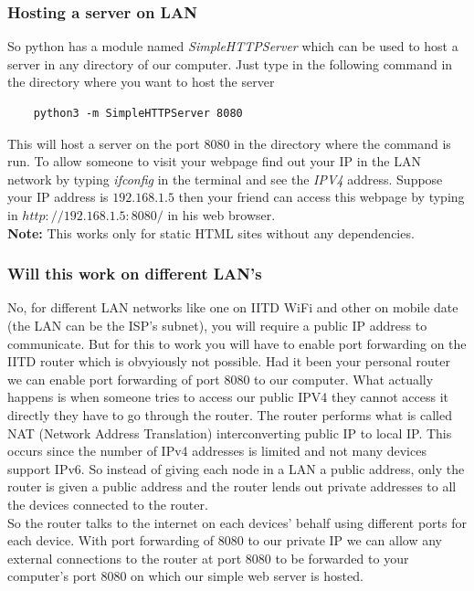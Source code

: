 \documentclass[12pt]{article}
\begin{document}
\subsubsection{Hosting a server on LAN}
So python has a module named \textit{SimpleHTTPServer} which can be used to host a server in any directory of our computer. Just type in the following command in the directory where you want to host the server

\begin{verbatim}
    python3 -m SimpleHTTPServer 8080
\end{verbatim}
This will host a server on the port 8080 in the directory where the command is run. To allow someone to visit your webpage find out your IP in the LAN network by typing \textit{ifconfig} in the terminal and see the \textit{IPV4} address.
Suppose your IP address is $192.168.1.5$ then your friend can access this webpage by typing in $http://192.168.1.5:8080/$ in his web browser.\\[0.2cm]

\textbf{Note:} This works only for static HTML sites without any dependencies.

\subsubsection{Will this work on different LAN's}
No, for different LAN networks like one on IITD WiFi and other on mobile date (the LAN can be the ISP's subnet), you will require a public IP address to communicate.
But for this to work you will have to enable port forwarding on the IITD router which is obvyiously not possible. Had it been your personal router we can enable port forwarding of port 8080 to our computer.
What actually happens is when someone tries to access our public IPV4 they cannot access it directly they have to go through the router. The router performs what is called NAT (Network Address Translation) interconverting public IP to local IP. This occurs since the number of IPv4 addresses is limited and not many devices support IPv6.
So instead of giving each node in a LAN a public address, only the router is given a public address and the router lends out private addresses to all the devices connected to the router.\\[0.2cm] So the router talks to the internet on each devices' behalf using different ports for each device.
With port forwarding of 8080 to our private IP we can allow any external connections to the router at port 8080 to be forwarded to your computer's port 8080 on which our simple web server is hosted.
 
\end{document}
